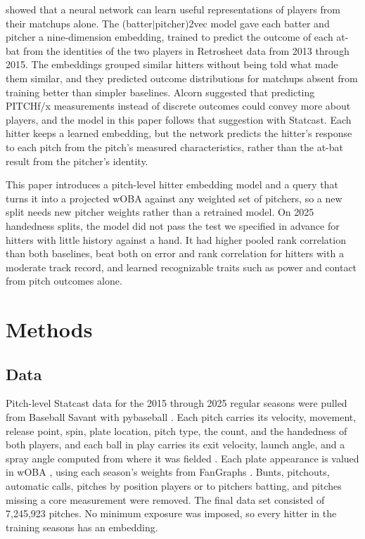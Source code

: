 \citet{alcorn2018} showed that a neural network can learn useful representations of players from their matchups alone. The (batter$|$pitcher)2vec model gave each batter and pitcher a nine-dimension embedding, trained to predict the outcome of each at-bat from the identities of the two players in Retrosheet data from 2013 through 2015. The embeddings grouped similar hitters without being told what made them similar, and they predicted outcome distributions for matchups absent from training better than simpler baselines. Alcorn suggested that predicting PITCHf/x measurements instead of discrete outcomes could convey more about players, and the model in this paper follows that suggestion with Statcast. Each hitter keeps a learned embedding, but the network predicts the hitter's response to each pitch from the pitch's measured characteristics, rather than the at-bat result from the pitcher's identity.

This paper introduces a pitch-level hitter embedding model and a query that turns it into a projected wOBA against any weighted set of pitchers, so a new split needs new pitcher weights rather than a retrained model. On 2025 handedness splits, the model did not pass the test we specified in advance for hitters with little history against a hand. It had higher pooled rank correlation than both baselines, beat both on error and rank correlation for hitters with a moderate track record, and learned recognizable traits such as power and contact from pitch outcomes alone.

\section{Methods}
\label{sec:methods}

\subsection{Data}
\label{sec:data}

Pitch-level Statcast data for the 2015 through 2025 regular seasons were pulled from Baseball Savant \citep{savant} with pybaseball \citep{pybaseball}. Each pitch carries its velocity, movement, release point, spin, plate location, pitch type, the count, and the handedness of both players, and each ball in play carries its exit velocity, launch angle, and a spray angle computed from where it was fielded \citep{albert2024}. Each plate appearance is valued in wOBA \citep{tango2007}, using each season's weights from FanGraphs \citep{fangraphsguts}. Bunts, pitchouts, automatic calls, pitches by position players or to pitchers batting, and pitches missing a core measurement were removed. The final data set consisted of 7,245,923 pitches. No minimum exposure was imposed, so every hitter in the training seasons has an embedding.

